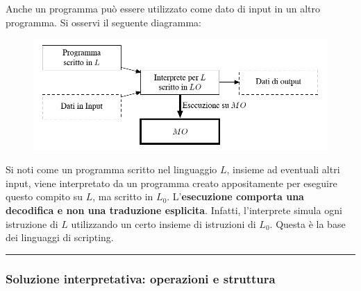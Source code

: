 \documentclass[a4paper]{article}
\newcommand{\longline}{\noindent\rule{\textwidth}{0.4pt}}
\begin{document}
	\noindent
	Anche un programma può essere utilizzato come dato di input in un altro programma. Si osservi il seguente diagramma:
	\begin{figure}[!htp]
		\centering
		\includegraphics[width=\textwidth]{img/programma_input.png}
	\end{figure}
	
	\noindent
	Si noti come un programma scritto nel linguaggio $L$, insieme ad eventuali altri input, viene interpretato da un programma creato appositamente per eseguire questo compito su $L$, ma scritto in $L_{0}$. L'\textbf{esecuzione comporta una decodifica e non una traduzione esplicita}. Infatti, l'interprete simula ogni istruzione di $L$ utilizzando un certo insieme di istruzioni di $L_{0}$. Questa è la base dei linguaggi di scripting.
		
	\longline
	
	\subsubsection{Soluzione interpretativa: operazioni e struttura}
	
\end{document}
